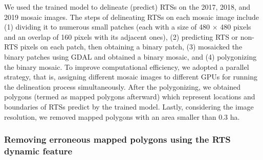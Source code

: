 \documentclass[authoryear,preprint,review,12pt]{elsarticle}
\begin{document}

We used the trained model to delineate (predict) RTSs on the 2017, 2018, and 2019 mosaic images. 
The steps of delineating RTSs on each mosaic image include
(1) dividing it to numerous small patches (each with a size of 480 $\times$ 480 pixels and an overlap of 160 pixels with its adjacent ones),
(2) predicting RTS or non-RTS pixels on each patch, then obtaining a binary patch,
(3) mosaicked the binary patches using GDAL and obtained a binary mosaic, and %
(4) polygonizing the binary mosaic.  %
To improve computational efficiency, we adopted a parallel strategy, that is, assigning different mosaic images to different GPUs for running the delineation process simultaneously. 
After the polygonizing, we obtained polygons (termed as mapped polygons afterward) which represent locations and boundaries of RTSs predict by the trained model. 
Lastly, considering the image resolution, we removed mapped polygons with an area smaller than 0.3 ha.

\subsubsection{Removing erroneous mapped polygons using the RTS dynamic feature}
\label{sec_improving_using_rts_dynamic}
\end{document}
